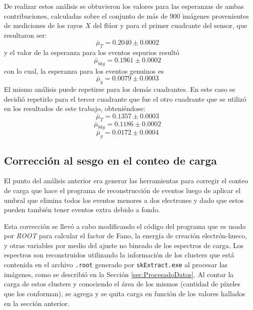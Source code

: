 De realizar estos análisis se obtuvieron los valores para las esperanzas de ambas contribuciones, calculadas sobre el conjunto de más de $900$ imágenes provenientes de mediciones de los rayos $X$ del flúor y para el primer cuadrante del sensor, que resultaron ser:
\begin{equation*}
    \bar{\mu}_{T} = 0.2040 \pm 0.0002
\end{equation*}
y el valor de la esperanza para los eventos espurios resultó 
\begin{equation*}
    \bar{\mu}_{bkg} = 0.1961 \pm 0.0002
\end{equation*}
con lo cual, la esperanza para los eventos genuinos es 
\begin{equation*}
    \bar{\mu}_{g} = 0.0079 \pm 0.0003   
\end{equation*}
El mismo análisis puede repetirse para los demás cuadrantes. En este caso se decidió repetirlo para el tercer cuadrante que fue el otro cuadrante que se utilizó en los resultados de este trabajo, obteniéndose:
\begin{equation*}
    \bar{\mu}_{T} = 0.1357 \pm 0.0003
\end{equation*}
\begin{equation*}
    \bar{\mu}_{bkg} = 0.1186 \pm 0.0002
\end{equation*}
\begin{equation*}
    \bar{\mu}_{g} = 0.0172 \pm 0.0004   
\end{equation*}

\subsection{Corrección al sesgo en el conteo de carga}
\noindent El punto del análisis anterior era generar las herramientas para corregir el conteo de carga que hace el programa de reconstrucción de eventos luego de aplicar el umbral que elimina todos los eventos menores a dos electrones y dado que estos pueden también tener eventos extra debido a fondo.

Esta corrección se llevó a cabo modificando el código del programa que es usado por \textit{ROOT} para calcular el factor de Fano, la energía de creación electrón-hueco, y otras variables por medio del ajuste no bineado de los espectros de carga. Los espectros son reconstruidos utilizando la información de los clusters que está contenida en el archivo \verb|.root| generado por \verb|skExtract.exe| al procesar las imágenes, como se describió en la Sección \ref{sec:ProcesadoDatos}. Al contar la carga de estos clusters y conociendo el área de los mismos (cantidad de píxeles que los conforman), se agrega y se quita carga en función de los valores hallados en la sección anterior.

